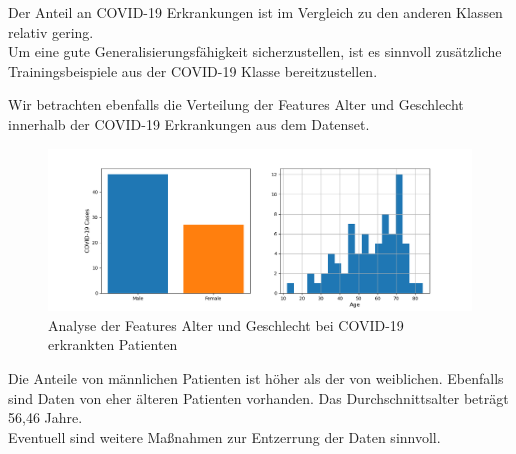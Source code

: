 Der Anteil an COVID-19 Erkrankungen ist im Vergleich zu den anderen Klassen relativ gering.\\
Um eine gute Generalisierungsfähigkeit sicherzustellen, ist es sinnvoll zusätzliche Trainingsbeispiele aus der COVID-19 Klasse bereitzustellen.

Wir betrachten ebenfalls die Verteilung der Features Alter und Geschlecht innerhalb der COVID-19 Erkrankungen aus dem Datenset.

\begin{figure}[ht]
	\centering
	\includegraphics[width=\textwidth]{../results/features_analysis.png}
	\caption{Analyse der Features Alter und Geschlecht bei COVID-19 erkrankten Patienten}
\end{figure}

Die Anteile von männlichen Patienten ist höher als der von weiblichen. Ebenfalls sind Daten von eher älteren Patienten vorhanden. Das Durchschnittsalter beträgt 56,46 Jahre.\\
Eventuell sind weitere Maßnahmen zur Entzerrung der Daten sinnvoll.
